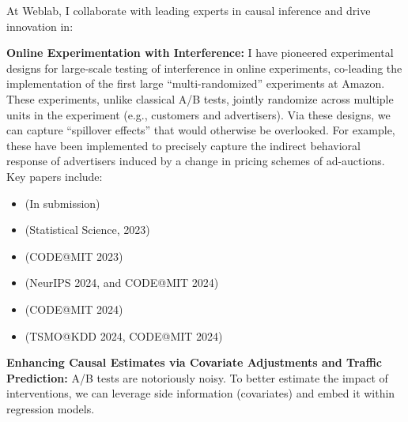 \documentclass[10pt, a4paper]{article}
\begin{document}
\par At Weblab, I collaborate with leading experts in causal inference and drive innovation in:

\begin{itemize}
    \item \textbf{Online Experimentation with Interference:} 
    I have pioneered experimental designs for large-scale testing of interference in online experiments, co-leading the implementation of the first large ``multi-randomized'' experiments at Amazon. These experiments, unlike classical A/B tests, jointly randomize across multiple units in the experiment (e.g., customers and advertisers). Via these designs, we can capture ``spillover effects'' that would otherwise be overlooked. For example, these have been implemented to precisely capture the indirect behavioral response of advertisers induced by a change in pricing schemes of ad-auctions. Key papers include: 
    \small{
        \begin{itemize}
	    \item \href{https://arxiv.org/abs/2401.01264}{\color{blue}{Multiple Randomization Designs}} (In submission)
            \item {\href{https://projecteuclid.org/journals/statistical-science/advance-publication/Experimental-Design-in-Marketplaces/10.1214/23-STS883.short}{\color{blue}{Experimental Design in Marketplaces}}} (Statistical Science, 2023)
            \item \href{https://www.amazon.science/publications/efficient-switchback-experiments-via-multiple-randomization-designs}{\color{blue}{Efficient Switchback Experiments via Multiple Randomization Designs}} (CODE@MIT 2023)
            \item \href{https://arxiv.org/abs/2405.18621}{\color{blue}{Multi-Armed Bandits with Network Interference}} (NeurIPS 2024, and CODE@MIT 2024)
            \item \href{}{\color{blue}{Regression Adjustments for Experimental Designs in Two-Side Marketplaces}} (CODE@MIT 2024)
            \item \href{}{\color{blue}{Measuring direct and Indirect Impacts in a Multi-Sided Marketplace: Evidence from a Clustered Multiple Randomization Experiment}} (TSMO@KDD 2024, CODE@MIT 2024)
        \end{itemize}
	}
	\normalsize{    
    \item \textbf{Enhancing Causal Estimates via Covariate Adjustments and Traffic Prediction:}
    A/B tests are notoriously noisy. To better estimate the impact of interventions, we can leverage side information (covariates) and embed it within regression models. 
}
\end{itemize}
\end{document}
